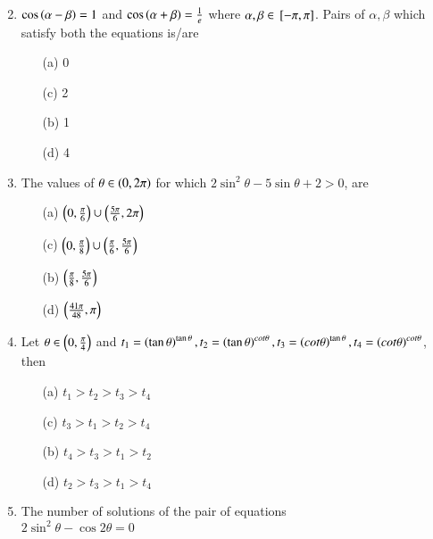 \documentclass[journal,12pt,twocolumn,article]{IEEEtran}
\theoremstyle{remark}
\begin{document}
\begin{enumerate}[start = 20]
\begin{multicols}{2}
\begin{enumerate}
\end{enumerate}
\end{multicols}
\item $\cos\left(\alpha - \beta\right)=1$ and $\cos\left(\alpha + \beta\right)=\frac{1}{e}$ where $\alpha, \beta \in {}\left[-\pi,\pi\right]$. Pairs of $\alpha, \beta$ which satisfy both the equations is/are
\hfill{}
\begin{multicols}{2}
\begin{enumerate}
\item[(a)] 0
\item[(c)] 2
\columnbreak
\item[(b)] 1
\item[(d)] 4 
\end{enumerate}
\end{multicols}
\item The values of $\theta \in \left(0,2\pi\right)$ for which $2\sin^2\theta - 5\sin\theta + 2 > 0$, are
\hfill{}
\begin{multicols}{2}
\begin{enumerate}
\item[(a)] $\left(0,\frac{\pi}{6}\right)\cup\left(\frac{5\pi}{6},2\pi\right)$
\item[(c)] $\left(0,\frac{\pi}{8}\right)\cup\left(\frac{\pi}{6},\frac{5\pi}{6}\right)$
\columnbreak
\item[(b)] $\left(\frac{\pi}{8},\frac{5\pi}{6}\right)$
\item[(d)] $\left(\frac{41\pi}{48},\pi\right)$
\end{enumerate}
\end{multicols}
\item Let $\theta \in \left(0,\frac{\pi}{4}\right)$ and 
$t_1 = \left(\tan\theta\right)^{\tan\theta}, t_2 = \left(\tan\theta\right)^{cot\theta},t_3 = \left(cot\theta\right)^{\tan\theta}, t_4 = \left(cot\theta\right)^{cot\theta}$, then
\hfill{}
\begin{multicols}{2}
\begin{enumerate}
\item[(a)] $t_1>t_2>t_3>t_4$
\item[(c)] $t_3>t_1>t_2>t_4$
\columnbreak
\item[(b)] $t_4>t_3>t_1>t_2$
\item[(d)] $t_2>t_3>t_1>t_4$
\end{enumerate}
\end{multicols}
\item The number of solutions of the pair of equations\\
$2\sin^2\theta - \cos2\theta = 0$\\

\end{enumerate}
\end{document}
